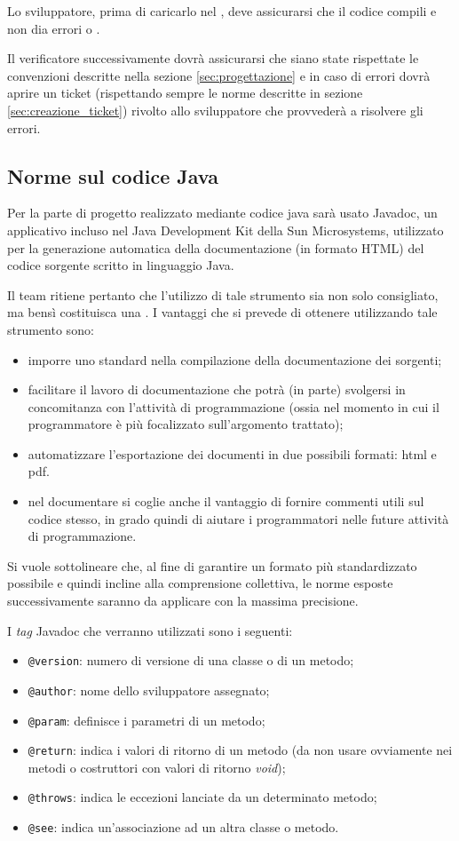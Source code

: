 {Lo sviluppatore, prima di caricarlo nel , deve assicurarsi che il codice compili e non dia errori o .

Il verificatore successivamente dovrà assicurarsi che siano state rispettate le convenzioni descritte nella sezione \vref{sec:progettazione} e in caso di errori dovrà aprire un ticket (rispettando sempre le norme descritte in sezione \vref{sec:creazione_ticket}) rivolto allo sviluppatore che provvederà a risolvere gli errori.

\subsection{Norme sul codice Java}
Per la parte di progetto realizzato mediante codice java sarà usato Javadoc, un applicativo incluso nel Java Development Kit della Sun Microsystems, utilizzato per la generazione automatica della documentazione (in formato HTML) del codice sorgente scritto in linguaggio Java.

Il team ritiene pertanto che l'utilizzo di tale strumento sia non solo consigliato, ma bensì costituisca una . I vantaggi che si prevede di ottenere utilizzando tale strumento sono:

\begin{itemize}
	\item imporre uno standard nella compilazione della documentazione dei sorgenti;
	\item facilitare il lavoro di documentazione che potrà (in parte) svolgersi in concomitanza con l'attività di programmazione (ossia nel momento in cui il programmatore è più focalizzato sull'argomento trattato);
	\item automatizzare l'esportazione dei documenti in due possibili formati: html e pdf.
	\item nel documentare si coglie anche il vantaggio di fornire commenti utili sul codice stesso, in grado quindi di aiutare i programmatori nelle future attività di programmazione.
\end{itemize}

Si vuole sottolineare che, al fine di garantire un formato più standardizzato possibile e quindi incline alla comprensione collettiva, le norme esposte successivamente saranno da applicare con la massima precisione.


I \textit{tag} Javadoc che verranno utilizzati sono i seguenti:
\begin{itemize}
\item \verb+@version+: numero di versione di una classe o di un metodo;
\item \verb+@author+: nome dello sviluppatore assegnato;
\item \verb+@param+: definisce i parametri di un metodo;
\item \verb+@return+: indica i valori di ritorno di un metodo (da non usare ovviamente nei metodi o costruttori con valori di ritorno \textit{void});
\item \verb+@throws+: indica le eccezioni lanciate da un determinato metodo;
\item \verb+@see+: indica un'associazione ad un altra classe o metodo.


\end{itemize}}
